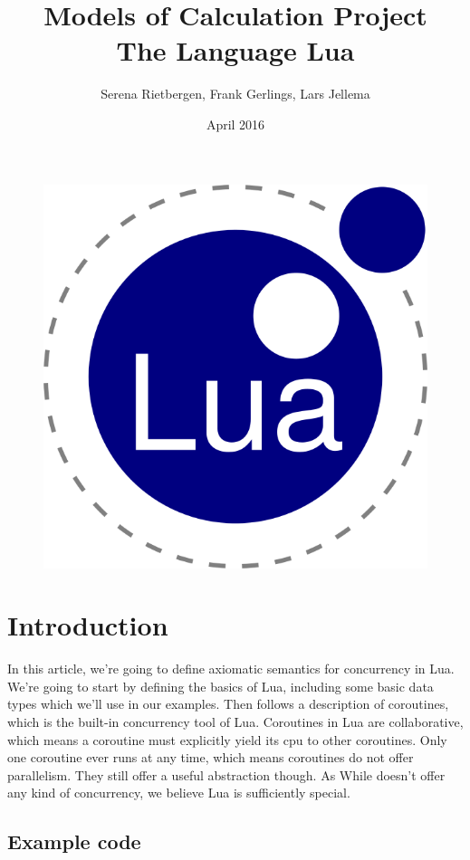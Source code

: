 \documentclass{article}
\title{Models of Calculation Project \\
         The Language Lua}
\author{Serena Rietbergen, Frank Gerlings, Lars Jellema}
\date{April 2016}
\begin{document}
\maketitle
\begin{figure}[!ht]
  \centering
    \includegraphics[scale=0.45]{lua}
\end{figure}
\newpage

\tableofcontents
\newpage

\section{Introduction}
In this article, we're going to define axiomatic semantics for concurrency in
Lua. We're going to start by defining the basics of Lua, including some basic
data types which we'll use in our examples. Then follows a description of
coroutines, which is the built-in concurrency tool of Lua. Coroutines in Lua are
collaborative, which means a coroutine must explicitly yield its cpu to other
coroutines. Only one coroutine ever runs at any time, which means coroutines do
not offer parallelism. They still offer a useful abstraction though. As While
doesn't offer any kind of concurrency, we believe Lua is sufficiently special.

\subsection{Example code}

\end{document}
